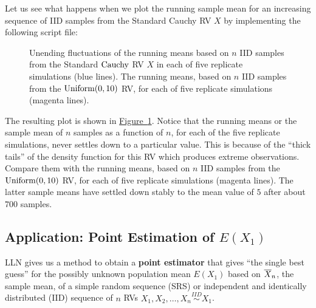 \begin{labwork}\label{LW:RunningMeanCauchy}
Let us see what happens when we plot the running sample mean for an increasing sequence of IID samples from the Standard Cauchy RV $X$ by implementing the following script file:


\begin{figure}[htpb]
\caption{Unending fluctuations of  the running means based on $n$ IID samples from the Standard $\mbox{{\rm Cauchy}}$ RV $X$ in each of five replicate simulations (blue lines).  The running means, based on $n$ IID samples from the $\mbox{{\rm Uniform}}(0,10)$ RV, for each of five replicate simulations (magenta lines). \label{F:plot5RunningMeansStandardcauchyUnif010}}
\centering   {}
\end{figure}

The resulting plot is shown in \hyperref[F:plot5RunningMeansStandardcauchyUnif010]{Figure~\ref*{F:plot5RunningMeansStandardcauchyUnif010}}.  Notice that the running means or the sample mean of $n$ samples as  a function of $n$, for each of the five replicate simulations, never settles down to a particular value.  This is because of the ``thick tails'' of the density function for this RV which produces extreme observations.  Compare them with the running means, based on $n$ IID samples from the $\mbox{{\rm Uniform}}(0,10)$ RV, for each of five replicate simulations (magenta lines).  The latter sample means have settled down stably to the mean value of $5$ after about $700$ samples.
\end{labwork}


\subsection{Application: Point Estimation of $E(X_1)$}
LLN gives us a method to obtain a {\bf point estimator} that gives ``the single best guess'' for the possibly unknown population mean $E(X_1)$ based on $\overline{X}_n$, the sample mean, of a simple random sequence (SRS) or independent and identically distributed (IID) sequence of $n$ RVs $X_1,X_2,\ldots, X_n \overset{IID}{\sim} X_1$.

